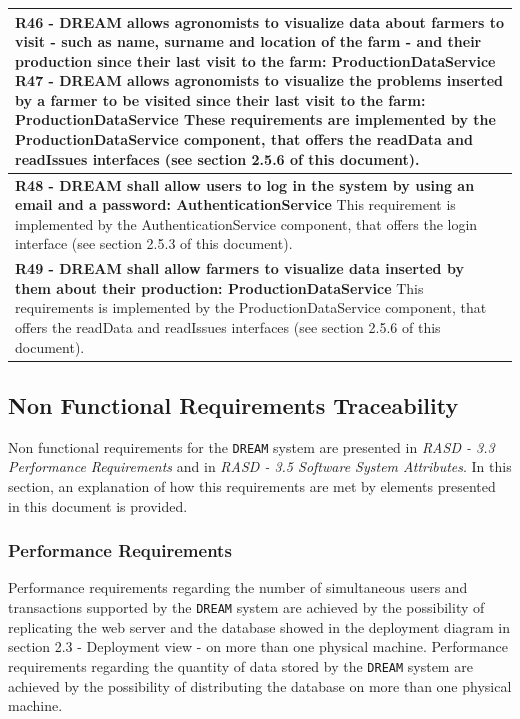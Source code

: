 \documentclass{article}
\begin{document}
\begin{longtable}[c]{|m{11.75cm}|}
    \textbf{R46 - DREAM allows agronomists to visualize data about farmers to visit - such as name, surname and location of the farm - and their production since their last visit to the farm: ProductionDataService
    \newline\newline
    R47 - DREAM allows agronomists to visualize the problems inserted by a farmer to be visited since their last visit to the farm: ProductionDataService}
    \newline\newline
    These requirements are implemented by the ProductionDataService component, that offers the readData and readIssues interfaces (see section 2.5.6 of this document). \\
    \hline
    
    \textbf{R48 - DREAM shall allow users to log in the system by using an email and a password: AuthenticationService}
    \newline\newline
    This requirement is implemented by the AuthenticationService component, that offers the login interface (see section 2.5.3 of this document). \\
    \hline
    
    \textbf{R49 - DREAM shall allow farmers to visualize data inserted by them about their production: ProductionDataService}
    \newline\newline
    This requirements is implemented by the ProductionDataService component, that offers the readData and readIssues interfaces (see section 2.5.6 of this document). \\
    \hline
\end{longtable}

\subsection{Non Functional Requirements Traceability}
Non functional requirements for the \verb|DREAM| system are presented in \textit{RASD - 3.3 Performance Requirements} and in \textit{RASD - 3.5 Software System Attributes}. In this section, an explanation of how this requirements are met by elements presented in this document is provided.

\subsubsection{Performance Requirements}
Performance requirements regarding the number of simultaneous users and transactions supported by the \verb|DREAM| system are achieved by the possibility of replicating the web server and the database showed in the deployment diagram in section 2.3 - Deployment view - on more than one physical machine. \newline
Performance requirements regarding the quantity of data stored by the \verb|DREAM| system are achieved by the possibility of distributing the database on more than one physical machine.
\end{document}
